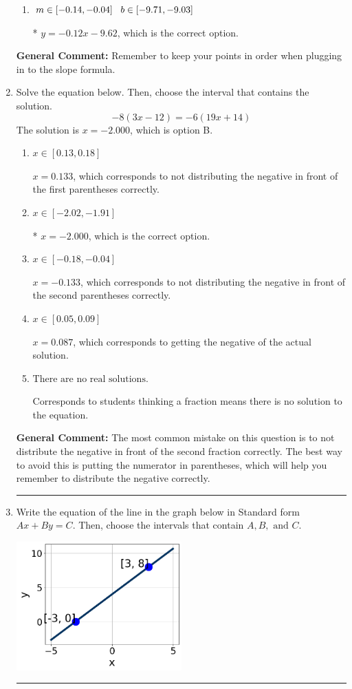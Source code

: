 \documentclass{extbook}[14pt]
\newcommand{\litem}[1]{\item #1

\rule{\textwidth}{0.4pt}}
\begin{document}
\begin{enumerate}
{\begin{enumerate}[label=\Alph*.]
 $y = -0.12x + 9.62$, which corresponds to using the correct slope and getting the negative y-intercept.
\item \( m \in [-0.14, -0.04] \hspace*{3mm} b \in [-9.71, -9.03] \)

* $y = -0.12x -9.62$, which is the correct option.
\end{enumerate}

\textbf{General Comment:} Remember to keep your points in order when plugging in to the slope formula.
}
\litem{
Solve the equation below. Then, choose the interval that contains the solution.
\[ -8(3x -12) = -6(19x + 14) \]The solution is \( x = -2.000 \), which is option B.\begin{enumerate}[label=\Alph*.]
\item \( x \in [0.13, 0.18] \)

$x = 0.133$, which corresponds to not distributing the negative in front of the first parentheses correctly.
\item \( x \in [-2.02, -1.91] \)

* $x = -2.000$, which is the correct option.
\item \( x \in [-0.18, -0.04] \)

$x = -0.133$, which corresponds to not distributing the negative in front of the second parentheses correctly.
\item \( x \in [0.05, 0.09] \)

$x = 0.087$, which corresponds to getting the negative of the actual solution.
\item \( \text{There are no real solutions.} \)

Corresponds to students thinking a fraction means there is no solution to the equation.
\end{enumerate}

\textbf{General Comment:} The most common mistake on this question is to not distribute the negative in front of the second fraction correctly. The best way to avoid this is putting the numerator in parentheses, which will help you remember to distribute the negative correctly.
}
\litem{
Write the equation of the line in the graph below in Standard form $Ax+By=C$. Then, choose the intervals that contain $A, B, \text{ and } C$.

\begin{center}
    \includegraphics[width=0.5\textwidth]{../Figures/linearGraphToStandardA.png}
\end{center}


}
\end{enumerate}
\end{document}
